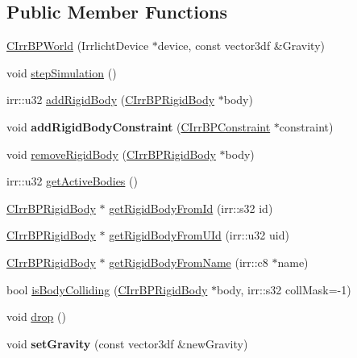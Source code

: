\subsection*{Public Member Functions}
\begin{DoxyCompactItemize}
\item 
\hyperlink{class_c_irr_b_p_world_a585d92e41db74a19bf1cb982ddc0cddc}{CIrrBPWorld} (IrrlichtDevice $\ast$device, const vector3df \&Gravity)
\item 
void \hyperlink{class_c_irr_b_p_world_aa676e88466f927af2ac0c4c8cd94e0f3}{stepSimulation} ()
\item 
irr::u32 \hyperlink{class_c_irr_b_p_world_a0bf527c522426b50d959ab5adc27be4c}{addRigidBody} (\hyperlink{class_c_irr_b_p_rigid_body}{CIrrBPRigidBody} $\ast$body)
\item 
\hypertarget{class_c_irr_b_p_world_a7565f787e92f3c3cf76da072fe175b11}{
void {\bfseries addRigidBodyConstraint} (\hyperlink{class_c_irr_b_p_constraint}{CIrrBPConstraint} $\ast$constraint)}
\label{class_c_irr_b_p_world_a7565f787e92f3c3cf76da072fe175b11}

\item 
void \hyperlink{class_c_irr_b_p_world_a7133c6b9763ac425ac579cdfbda8788b}{removeRigidBody} (\hyperlink{class_c_irr_b_p_rigid_body}{CIrrBPRigidBody} $\ast$body)
\item 
irr::u32 \hyperlink{class_c_irr_b_p_world_a66e4c4aeef5d3ae6f907753860b8fd5a}{getActiveBodies} ()
\item 
\hyperlink{class_c_irr_b_p_rigid_body}{CIrrBPRigidBody} $\ast$ \hyperlink{class_c_irr_b_p_world_a7ebeb8e75b825a493daa1cea6d07aa21}{getRigidBodyFromId} (irr::s32 id)
\item 
\hyperlink{class_c_irr_b_p_rigid_body}{CIrrBPRigidBody} $\ast$ \hyperlink{class_c_irr_b_p_world_a1b96effdaad31a6e05185f2b683a0445}{getRigidBodyFromUId} (irr::u32 uid)
\item 
\hyperlink{class_c_irr_b_p_rigid_body}{CIrrBPRigidBody} $\ast$ \hyperlink{class_c_irr_b_p_world_a1ed94585fa44f0ab99cfa4a1fdc29fcd}{getRigidBodyFromName} (irr::c8 $\ast$name)
\item 
bool \hyperlink{class_c_irr_b_p_world_abc8fc2e0dbc203106e91cb1e944c496a}{isBodyColliding} (\hyperlink{class_c_irr_b_p_rigid_body}{CIrrBPRigidBody} $\ast$body, irr::s32 collMask=-\/1)
\item 
void \hyperlink{class_c_irr_b_p_world_a7cd82f40cde955cb54c1fc0268691be6}{drop} ()
\item 
\hypertarget{class_c_irr_b_p_world_a96e06a9d2b64d474bfd5325d2ffe809e}{
void {\bfseries setGravity} (const vector3df \&newGravity)}
\label{class_c_irr_b_p_world_a96e06a9d2b64d474bfd5325d2ffe809e}


\end{DoxyCompactItemize}
